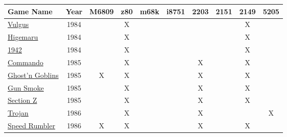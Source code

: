 \begin{figure}[H]
{\begin{tabularx}{\textwidth}{Xccccccccc}
  \textbf{Game Name} & \textbf{Year} & \textbf{M6809} & \textbf{z80} & \textbf{m68k} & \textbf{i8751} & \textbf{2203} & \textbf{2151} & \textbf{2149} & \textbf{5205} \\               
  \toprule    
\href{https://www.youtube.com/watch?v=45ELzG1ivEA}{Vulgus}
                & 1984          &               &      X       &              &              &               &               &       X       &               \\
\href{https://www.youtube.com/watch?v=R5mg6XPqtBs}{Higemaru}
                & 1984          &               &      X       &              &              &               &               &       X       &               \\
\href{https://www.youtube.com/watch?v=Em7UwOOBvlA}{1942}
                & 1984          &               &      X       &              &              &               &               &       X       &               \\
  \toprule    
\href{https://www.youtube.com/watch?v=1qctKI_t5eY}{Commando}
                & 1985          &               &      X       &              &              &       X       &               &       X       &               \\
\href{https://www.youtube.com/watch?v=SugLAqaPhqA}{Ghost'n Goblins}  
                & 1985          &       X       &      X       &              &              &       X       &               &       X       &               \\
\href{https://www.youtube.com/watch?v=mrO9qwGXdy8}{Gun Smoke}        
                & 1985          &               &      X       &              &              &       X       &               &       X       &               \\
\href{https://www.youtube.com/watch?v=cIC2mNNryZg}{Section Z}
                & 1985          &               &      X       &              &              &       X       &               &       X       &               \\
  \toprule    
\href{https://www.youtube.com/watch?v=L1FVWdlQNG8}{Trojan}
                & 1986          &               &      X       &              &              &       X       &               &               &       X       \\
\href{https://www.youtube.com/watch?v=57lg9pFUgco}{Speed Rumbler}
                & 1986          &       X       &      X       &              &              &       X       &               &       X       &               \\

\end{tabularx}}
\end{figure}
